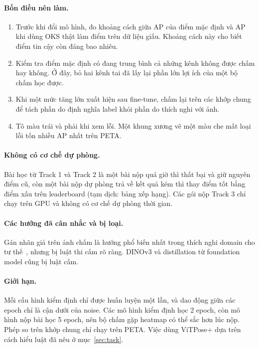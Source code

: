 \documentclass[11pt,a4paper]{article}
\begin{document}
\paragraph{Bốn điều nên làm.}
\begin{enumerate}[leftmargin=1.6em]
\item Trước khi đổi mô hình, đo khoảng cách giữa AP của điểm mặc định và AP khi dùng OKS thật làm điểm trên dữ liệu giấu. Khoảng cách này cho biết điểm tin cậy còn đáng bao nhiêu.
\item Kiểm tra điểm mặc định có đang trung bình cả những kênh không được chấm hay không. Ở đây, bỏ hai kênh tai đã lấy lại phần lớn lợi ích của một bộ chấm học được.
\item Khi một mức tăng lớn xuất hiện sau fine-tune, chấm lại trên các khớp chung để tách phần do định nghĩa label khỏi phần do thích nghi với ảnh.
\item Tô màu trái và phải khi xem lỗi. Một khung xương vẽ một màu che mất loại lỗi tốn nhiều AP nhất trên PETA.
\end{enumerate}

\paragraph{Không có cơ chế dự phòng.} Bài học từ Track 1 và Track 2 là một bài nộp quá giờ thì thất bại và giữ nguyên điểm cũ, còn một bài nộp dự phòng trả về kết quả kém thì thay điểm tốt bằng điểm xấu trên leaderboard (tạm dịch: bảng xếp hạng). Các gói nộp Track 3 chỉ chạy trên GPU và không có cơ chế dự phòng thời gian.

\paragraph{Các hướng đã cân nhắc và bị loại.} Gán nhãn giả trên ảnh chấm là hướng phổ biến nhất trong thích nghi domain cho tư thế~\cite{regda,kim2022}, nhưng bị luật thi cấm rõ ràng. DINOv3 và distillation từ foundation model cũng bị luật cấm.

\paragraph{Giới hạn.} Mỗi cấu hình kiểm định chỉ được huấn luyện một lần, và dao động giữa các epoch chỉ là cận dưới của noise. Các mô hình kiểm định học 2 epoch, còn mô hình nộp bài học 5 epoch, nên bộ chấm gặp heatmap có thể sắc hơn lúc nộp. Phép so trên khớp chung chỉ chạy trên PETA. Việc dùng ViTPose+ dựa trên cách hiểu luật đã nêu ở mục~\ref{sec:task}.
\end{document}
